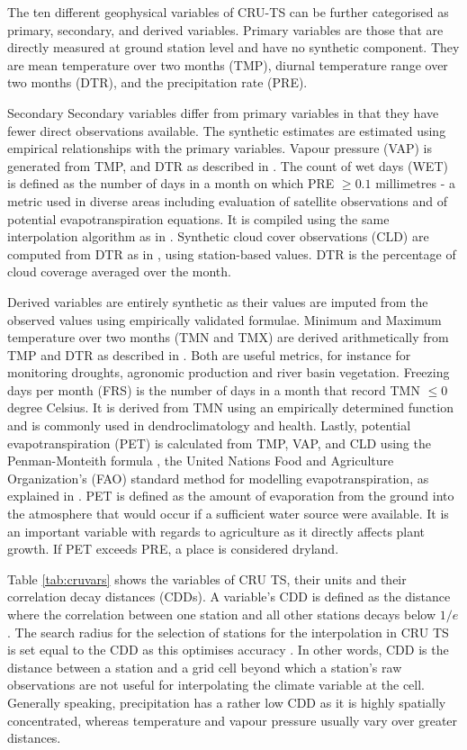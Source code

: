 \documentclass[a4paper,12pt]{article}
\theoremstyle{plain}
\theoremstyle{definition}
\theoremstyle{definition}
\theoremstyle{definition}
\theoremstyle{definition}
\begin{document}
The ten different geophysical variables of CRU-TS can be further categorised as primary, secondary, and derived variables. Primary variables are those that are directly measured at ground station level and have no synthetic component. They are mean temperature over two months (TMP), diurnal temperature range over two months (DTR), and the precipitation rate (PRE).

Secondary Secondary variables differ from primary variables in that they have fewer direct observations available. The synthetic estimates are estimated using empirical relationships with the primary variables. Vapour pressure (VAP) is generated from TMP, and DTR as described in \citet{harris2020}. The count of wet days (WET) is defined as the number of days in a month on which PRE $\geq0.1$ millimetres - a metric used in diverse areas including evaluation of satellite observations and of potential evapotranspiration equations. It is compiled using the same interpolation algorithm as in \citet{harris2014}. Synthetic cloud cover observations (CLD) are computed from DTR as in \citet{harris2014}, using station-based values. DTR is the percentage of cloud coverage averaged over the month.

Derived variables are entirely synthetic as their values are imputed from the observed values using empirically validated formulae. Minimum and Maximum temperature over two months (TMN and TMX) are derived arithmetically from TMP and DTR as described in \citet{harris2014}. Both are useful metrics, for instance for monitoring droughts, agronomic production and river basin vegetation. Freezing days per month (FRS) is the number of days in a month that record TMN $\leq 0$ degree Celsius. It is derived from TMN using an empirically determined function and is commonly used in dendroclimatology and health. Lastly, potential evapotranspiration (PET) is calculated from TMP, VAP, and CLD using the Penman-Monteith formula \citep{allen1998}, the United Nations Food and Agriculture Organization's (FAO) standard method for modelling evapotranspiration, as explained in \citet[][pp. 1071 - 1072]{ekstrom2007}. PET is defined as the amount of evaporation from the ground into the atmosphere that would occur if a sufficient water source were available. It is an important variable with regards to agriculture as it directly affects plant growth. If PET exceeds PRE, a place is considered dryland.

Table \ref{tab:cruvars} shows the variables of CRU TS, their units and their correlation decay distances (CDDs). A variable's CDD is defined as the distance where the correlation between one station and all other stations decays below $1/e$. The search radius for the selection of stations for the interpolation in CRU TS is set equal to the CDD as this optimises accuracy \citet{harris2020}. In other words, CDD is the distance between a station and a grid cell beyond which a station's raw observations are not useful for interpolating the climate variable at the cell. Generally speaking, precipitation has a rather low CDD as it is highly spatially concentrated, whereas temperature and vapour pressure usually vary over greater distances.
\end{document}
